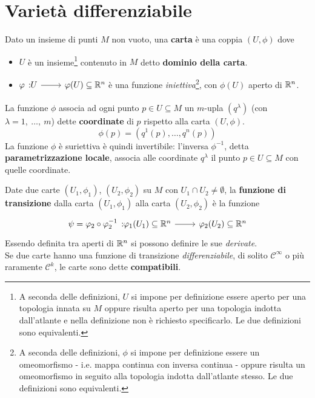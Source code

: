 \section{Varietà differenziabile}
\begin{define}
	Dato un insieme di punti $M$ non vuoto, una \textbf{carta} è una coppia $\left(U,\phi\right)$ dove
	\begin{itemize}
		\item $U$ è un insieme\footnote{A seconda delle definizioni, $U$ si impone per definizione essere aperto per una topologia innata su $M$ oppure risulta aperto per una topologia indotta dall'atlante e nella definizione non è richiesto specificarlo. Le due definizioni sono equivalenti.} contenuto in $M$ detto \textbf{dominio della carta}.
		\item $\funz[\phi]{U}{\phi(U)\subseteq \realset^n}$ è una funzione \textit{iniettiva}\footnote{A seconda delle definizioni, $\phi$ si impone per definizione essere un omeomorfismo - i.e. mappa continua con inversa continua - oppure risulta un omeomorfismo in seguito alla topologia indotta dall'atlante stesso. Le due definizioni sono equivalenti.}, con $\phi(U)$ aperto di $\mathbb{R}^n$.
	\end{itemize}
	La funzione $\phi$ associa ad ogni punto $p\in U\subseteq M$ un $m$-upla $\left(q^{\lambda}\right)$ (con $\lambda=1,\ \ldots,\ m$) dette \textbf{coordinate} di $p$ rispetto alla carta $\left(U,\phi\right)$.
	\begin{equation}
		\phi\left(p\right)=\left(q^1\left(p\right),\ldots,q^n\left(p\right)\right)
	\end{equation}
	La funzione $\phi$ è suriettiva è quindi invertibile: l'inversa $\phi^{-1}$, detta  \textbf{parametrizzazione locale}, associa alle coordinate $q^{\lambda}$ il punto $p\in U\subseteq M$ con quelle coordinate.
\end{define}
\begin{define}
	Date due carte $\left(U_1,\phi_1\right)$, $\left(U_2,\phi_2\right)$ su $M$ con $U_1\cap U_2\neq \emptyset$, la \textbf{funzione di transizione} dalla carta $\left(U_1,\phi_1\right)$ alla carta $\left(U_2,\phi_2\right)$ è la funzione
	\begin{equation}
		\funz[\psi=\phi_2\circ\phi_2^{-1}]{\phi_1(U_1)\subseteq\realset^{n}}{\phi_2(U_2)\subseteq\realset^{n}}
	\end{equation}
	Essendo definita tra aperti di $\mathbb{R}^n$ si possono definire le sue \textit{derivate}.\\
	Se due carte hanno una funzione di transizione \textit{differenziabile}, di solito $\mathcal{C}^{\infty}$ o più raramente $\mathcal{C}^{k}$, le carte sono dette \textbf{compatibili}.
\end{define}
